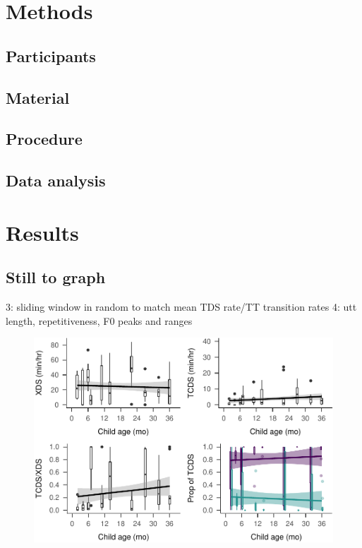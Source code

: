 \documentclass[man]{apa6}
\theoremstyle{definition}
\theoremstyle{definition}
\theoremstyle{definition}
\theoremstyle{remark}
\begin{document}
\section{Methods}\label{methods}

\subsection{Participants}\label{participants}

\subsection{Material}\label{material}

\subsection{Procedure}\label{procedure}

\subsection{Data analysis}\label{data-analysis}

\section{Results}\label{results}

\subsection{Still to graph}\label{still-to-graph}

3: sliding window in random to match mean TDS rate/TT transition rates
4: utt length, repetitiveness, F0 peaks and ranges

\begin{figure}
\centering
\includegraphics{Tseltal-CLE_files/figure-latex/plot_XDS_TDS_quantity_random-1.pdf}
\caption{}
\end{figure}
\end{document}
